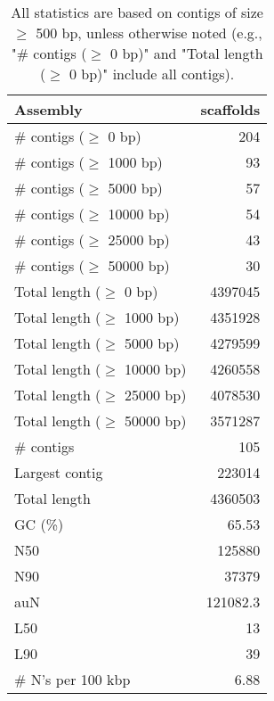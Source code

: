 \documentclass[12pt,a4paper]{article}
\begin{document}
\begin{table}[ht]
\begin{center}
\caption{All statistics are based on contigs of size $\geq$ 500 bp, unless otherwise noted (e.g., "\# contigs ($\geq$ 0 bp)" and "Total length ($\geq$ 0 bp)" include all contigs).}
\begin{tabular}{|l*{1}{|r}|}
\hline
Assembly & scaffolds \\ \hline
\# contigs ($\geq$ 0 bp) & 204 \\ \hline
\# contigs ($\geq$ 1000 bp) & 93 \\ \hline
\# contigs ($\geq$ 5000 bp) & 57 \\ \hline
\# contigs ($\geq$ 10000 bp) & 54 \\ \hline
\# contigs ($\geq$ 25000 bp) & 43 \\ \hline
\# contigs ($\geq$ 50000 bp) & 30 \\ \hline
Total length ($\geq$ 0 bp) & 4397045 \\ \hline
Total length ($\geq$ 1000 bp) & 4351928 \\ \hline
Total length ($\geq$ 5000 bp) & 4279599 \\ \hline
Total length ($\geq$ 10000 bp) & 4260558 \\ \hline
Total length ($\geq$ 25000 bp) & 4078530 \\ \hline
Total length ($\geq$ 50000 bp) & 3571287 \\ \hline
\# contigs & 105 \\ \hline
Largest contig & 223014 \\ \hline
Total length & 4360503 \\ \hline
GC (\%) & 65.53 \\ \hline
N50 & 125880 \\ \hline
N90 & 37379 \\ \hline
auN & 121082.3 \\ \hline
L50 & 13 \\ \hline
L90 & 39 \\ \hline
\# N's per 100 kbp & 6.88 \\ \hline
\end{tabular}
\end{center}
\end{table}
\end{document}
